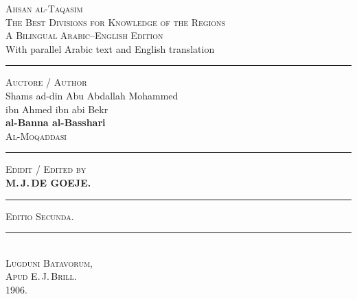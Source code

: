 \documentclass[11pt,a4paper]{article}
\newcommand{\shortline}{\noindent\rule{0.5\textwidth}{0.4pt}\par}
\begin{document}
\thispagestyle{empty}
\begin{center}
\vspace*{1.5cm}

{\Huge\textsc{Ahsan al-Taqasim}}\\[0.5cm]
{\Large\textsc{The Best Divisions for Knowledge of the Regions}}\\[1.5cm]

{\large\textsc{A Bilingual Arabic--English Edition}}\\[0.5cm]
{\small With parallel Arabic text and English translation}\\[1cm]

\shortline
\vspace{0.5cm}

{\Large\textsc{Auctore / Author}}\\[0.5cm]

{\Large Shams ad-din Abu Abdallah Mohammed}\\
{\Large ibn Ahmed ibn abi Bekr}\\[0.3cm]
{\Large\textbf{al-Banna al-Basshari}}\\[0.5cm]
{\LARGE\textsc{Al-Moqaddasi}}\\[1.5cm]

\shortline
\vspace{0.5cm}

{\large\textsc{Edidit / Edited by}}\\[0.5cm]

{\LARGE\textbf{M.\,J.\,DE GOEJE.}}\\[1cm]

\shortline
\vspace{0.5cm}

{\large\textsc{Editio Secunda.}}\\[1.5cm]

\vfill

\rule{0.3\textwidth}{0.6pt}\\[0.5cm]

{\large\textsc{Lugduni Batavorum,}}\\
{\large\textsc{Apud E.\,J.\,Brill.}}\\
{\large\textsc{1906.}}\\

\end{center}
\clearpage

\setcounter{page}{1}
\end{document}
